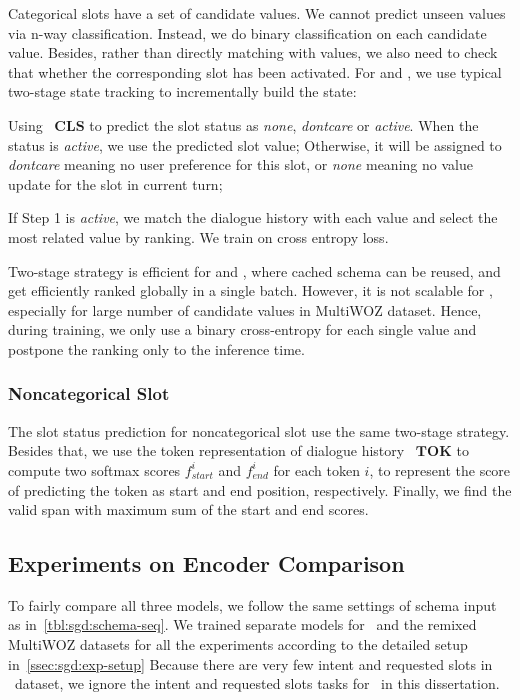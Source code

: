 Categorical slots have a set of candidate values. We cannot predict
unseen values via n-way classification. Instead, we do binary
classification on each candidate value. Besides, rather than directly
matching with values, we also need to check that whether the
corresponding slot has been activated. For \CE and \FE, we use typical
two-stage state tracking to incrementally build the state:
\begin{inparaenum}[{\bf Step} 1.]
\item Using ~$\mathbf{CLS}$ to predict the slot status as
  \textit{none}, \textit{dontcare} or \textit{active}. When the status is
  \textit{active}, we use the predicted slot value; Otherwise, it
  will be assigned to \textit{dontcare} meaning no user preference for this
  slot, or \textit{none} meaning no value update for the slot in current turn;
\item If Step 1 is \textit{active}, we match the dialogue
  history with each value and select the most related value by ranking. We train on cross entropy loss.
\end{inparaenum}
Two-stage strategy is efficient for \DE and \FE, where cached schema
can be reused, and get efficiently ranked globally in a single
batch. However, it is not scalable for \CE, especially for large
number of candidate values in MultiWOZ dataset. Hence, during
training, we only use a binary cross-entropy for each single value and
postpone the ranking only to the inference time.

\subsubsection{Noncategorical Slot}
\label{sssec:sgd:noncategorical-slot}
The slot status prediction for
noncategorical slot use the same two-stage strategy. Besides that, we
use the token representation of dialogue history ~$\mathbf{TOK}$ to
compute two softmax scores $f^{i}_{start}$ and $f^{i}_{end}$ for each
token $i$, to represent the score of predicting the token as start and
end position, respectively. Finally, we find the valid span with
maximum sum of the start and end scores.

\subsection{Experiments on Encoder Comparison}
\label{ssec:encoder-results}
To fairly compare all three models, we follow the same settings of
schema input as in~\autoref{tbl:sgd:schema-seq}. We trained separate
models for \sgdst~and the remixed MultiWOZ datasets for all the
experiments according to the detailed setup
in~\autoref{ssec:sgd:exp-setup} Because there are very few intent and
requested slots in \multiwoz~dataset, we ignore the intent and
requested slots tasks for \multiwoz~in this dissertation.


